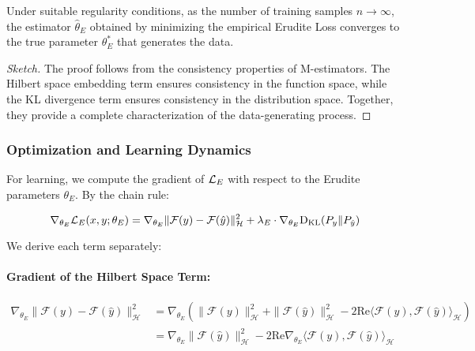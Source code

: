 \begin{theorem}
Under suitable regularity conditions, as the number of training samples $n \to \infty$, the estimator $\hat{\theta}_E$ obtained by minimizing the empirical Erudite Loss converges to the true parameter $\theta_E^*$ that generates the data.
\end{theorem}

\begin{proof}[Sketch]
The proof follows from the consistency properties of M-estimators. The Hilbert space embedding term ensures consistency in the function space, while the KL divergence term ensures consistency in the distribution space. Together, they provide a complete characterization of the data-generating process.
\end{proof}

\subsubsection{Optimization and Learning Dynamics}

For learning, we compute the gradient of $\mathcal{L}_E$ with respect to the Erudite parameters $\theta_E$. By the chain rule:

\begin{equation}
\nabla_{\theta_E} \mathcal{L}_E(x, y; \theta_E) = \nabla_{\theta_E} \|\mathcal{F}(y) - \mathcal{F}(\hat{y})\|_{\mathcal{H}}^2 + \lambda_E \cdot \nabla_{\theta_E} \mathrm{D_{KL}}(P_y \| P_{\hat{y}})
\end{equation}

We derive each term separately:

\paragraph{Gradient of the Hilbert Space Term:}
\begin{equation}
\begin{aligned}
\nabla_{\theta_E} \|\mathcal{F}(y) - \mathcal{F}(\hat{y})\|_{\mathcal{H}}^2 &= \nabla_{\theta_E} \left( \|\mathcal{F}(y)\|_{\mathcal{H}}^2 + \|\mathcal{F}(\hat{y})\|_{\mathcal{H}}^2 - 2\text{Re}\langle \mathcal{F}(y), \mathcal{F}(\hat{y}) \rangle_{\mathcal{H}} \right) \\
&= \nabla_{\theta_E} \|\mathcal{F}(\hat{y})\|_{\mathcal{H}}^2 - 2\text{Re}\nabla_{\theta_E}\langle \mathcal{F}(y), \mathcal{F}(\hat{y}) \rangle_{\mathcal{H}}
\end{aligned}
\end{equation}

